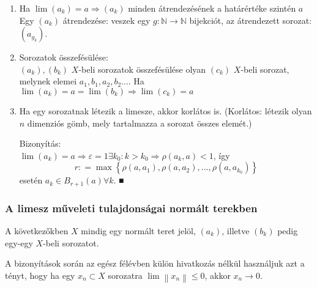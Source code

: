 \documentclass[12pt,a4paper]{scrartcl}
\newenvironment{bizonyitas}{}{}
\begin{document}
\begin{enumerate}
\begin{bizonyitas}
  \end{bizonyitas}
\item
  Ha
  \(\left. \lim\left( a_{k} \right) = a\Rightarrow\left( a_{k} \right) \right.\)
  minden átrendezésének a határértéke szintén \(a\)\\
  Egy \(\left( a_{k} \right)\) átrendezése: veszek egy
  \(\left. g:{\mathbb{N}}\rightarrow{\mathbb{N}} \right.\) bijekciót, az
  átrendezett sorozat: \(\left( a_{g_{k}} \right)\).
\item
  Sorozatok összefésülése:\\
  \(\left( a_{k} \right),\left( b_{k} \right)\) \(X\)-beli sorozatok
  összefésülése olyan \(\left( c_{k} \right)\) \(X\)-beli sorozat,
  melynek elemei \(a_{1},b_{1},a_{2},b_{2}...\). Ha
  \(\left. \lim\left( a_{k} \right) = a = \lim\left( b_{k} \right)\Rightarrow\lim\left( c_{k} \right) = a \right.\)
\item
  Ha egy sorozatnak létezik a limesze, akkor korlátos is. (Korlátos:
  létezik olyan \(n\) dimenziós gömb, mely tartalmazza a sorozat összes
  elemét.)

  \begin{bizonyitas}

  Bizonyítás:\\
  \(\left. \lim\left( a_{k} \right) = a\Rightarrow\varepsilon = 1\exists k_{0}:k > k_{0}\Rightarrow\rho\left( {a_{k},a} \right) < 1 \right.\),
  így
  \[r: = \max\left\{ {\rho\left( {a,a_{1}} \right),\rho\left( {a,a_{2}} \right),...,\rho\left( {a,a_{k_{0}}} \right)} \right\}\]
  esetén \(a_{k} \in B_{r + 1}\left( a \right)\forall k\). ■

  \end{bizonyitas}
\end{enumerate}

\hypertarget{a-limesz-muveleti-tulajdonsagai-normalt-terekben}{%
\subsubsection{A limesz műveleti tulajdonságai normált
terekben}\label{a-limesz-muveleti-tulajdonsagai-normalt-terekben}}

A következőkben \(X\) mindig egy normált teret jelöl,
\(\left( a_{k} \right)\), illetve \(\left( b_{k} \right)\) pedig egy-egy
\(X\)-beli sorozatot.

A bizonyítások során az egész félévben külön hivatkozás nélkül
használjuk azt a tényt, hogy ha egy \(x_{n} \subset X\) sorozatra
\(\lim\left\| x_{n} \right\| \leq 0\), akkor
\(\left. x_{n}\rightarrow 0 \right.\).
\end{document}
